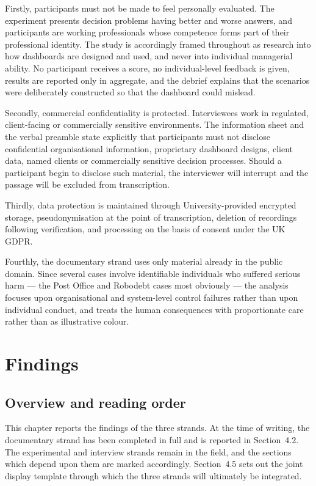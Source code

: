 \documentclass[11pt,a4paper]{article}
\numberwithin{figure}{section}
\numberwithin{table}{section}
\newcommand{\xref}[1]{\textcolor{citeblue}{#1}}         %
\begin{document}
Firstly, participants must not be made to feel personally evaluated. The experiment presents
decision problems having better and worse answers, and participants are working professionals whose
competence forms part of their professional identity. The study is accordingly framed throughout as
research into how dashboards are designed and used, and never into individual managerial ability.
No participant receives a score, no individual-level feedback is given, results are reported only in
aggregate, and the debrief explains that the scenarios were deliberately constructed so that the
dashboard could mislead.

Secondly, commercial confidentiality is protected. Interviewees work in regulated, client-facing or
commercially sensitive environments. The information sheet and the verbal preamble state explicitly
that participants must not disclose confidential organisational information, proprietary dashboard
designs, client data, named clients or commercially sensitive decision processes. Should a
participant begin to disclose such material, the interviewer will interrupt and the passage will be
excluded from transcription.

Thirdly, data protection is maintained through University-provided encrypted storage,
pseudonymisation at the point of transcription, deletion of recordings following verification, and
processing on the basis of consent under the UK GDPR.

Fourthly, the documentary strand uses only material already in the public domain. Since several
cases involve identifiable individuals who suffered serious harm --- the Post Office and Robodebt
cases most obviously --- the analysis focuses upon organisational and system-level control failures
rather than upon individual conduct, and treats the human consequences with proportionate care
rather than as illustrative colour.

\section{Findings}

\subsection{Overview and reading order}

This chapter reports the findings of the three strands. At the time of writing, the documentary
strand has been completed in full and is reported in \xref{Section~4.2}. The experimental and
interview strands remain in the field, and the sections which depend upon them are marked
accordingly. \xref{Section~4.5} sets out the joint display template through which the three strands
will ultimately be integrated.
\end{document}
